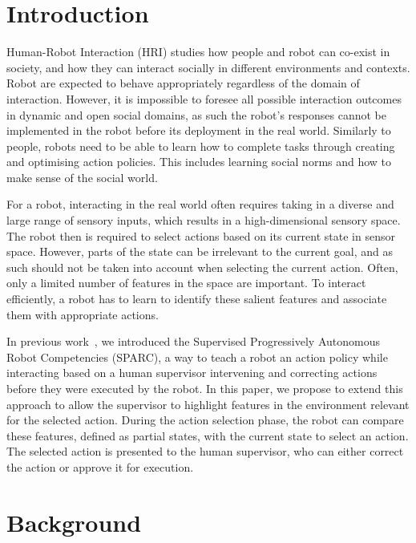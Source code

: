 \documentclass[letterpaper]{article} %
\begin{document}
\section{Introduction}

Human-Robot Interaction (HRI) studies how people and robot can co-exist in
 society, and how they can interact socially in different environments and
 contexts. Robot are expected to behave appropriately regardless of the domain
 of interaction. However, it is impossible to foresee all possible interaction
 outcomes in dynamic and open social domains, as such the robot's responses
 cannot be implemented in the robot before its deployment in the real world.
 Similarly to  people, robots need to be able to learn how to complete tasks
 through creating and optimising action policies. This includes learning social
 norms and how to make sense of the social world.

For a robot, interacting in the real world often requires taking in a diverse
 and large range of sensory inputs, which results in a high-dimensional sensory
 space. The robot then is required to select actions based on its current state
 in sensor space. However, parts of the state can be irrelevant to the current
 goal, and as such should not be taken into account when selecting the current
 action. Often, only a limited number of features in the space are important. To
 interact efficiently, a robot has to learn to identify these salient features
 and associate them with appropriate actions.

In previous work~\cite{senft2015sparc,senft2017supervised}, we introduced the
Supervised Progressively Autonomous Robot Competencies (SPARC), a way to teach a
robot an action policy while interacting based on a human supervisor intervening
and correcting actions before they were executed by the robot. In this paper, we
propose to extend this approach to allow the supervisor to highlight features in
the environment relevant for the selected action. During the action selection
phase, the robot can compare these features, defined as partial states, with the
current state to select an action. The selected action is presented to the human
supervisor, who can either correct the action or approve it for execution.


\section{Background}
\end{document}
